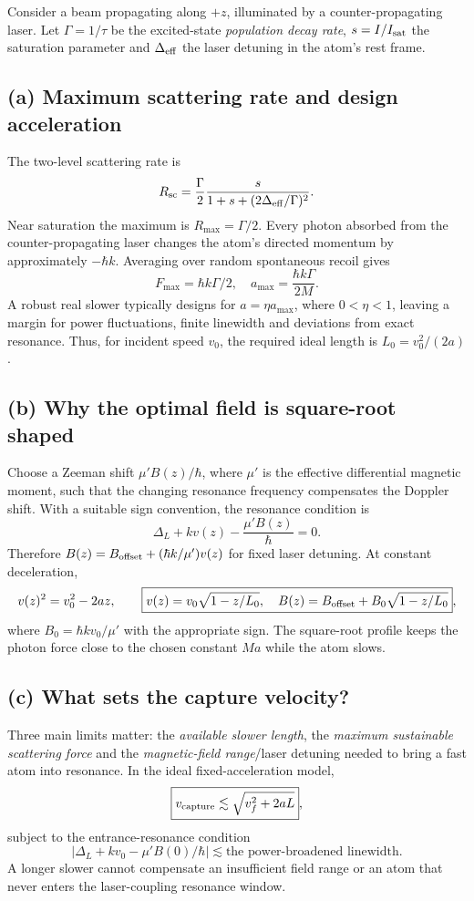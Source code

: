 Consider a beam propagating along \(+z\), illuminated by
a counter-propagating laser. Let \(\Gamma=1/\tau\)
be the excited-state \emph{population decay rate},
\(s=I/I_{\rm sat}\) the saturation parameter and
\(\Delta_{\rm eff}\) the laser detuning in the
atom's rest frame.

\subsection*{(a) Maximum scattering rate and design acceleration}
The two-level scattering rate is
\[
R_{\rm sc}=\frac{\Gamma}{2}
\frac{s}{1+s+(2\Delta_{\rm eff}/\Gamma)^2}.
\]
Near saturation the maximum is
\(R_{\max}=\Gamma/2\).
Every photon absorbed from the counter-propagating
laser changes the atom's directed momentum by
approximately \(-\hbar k\). Averaging over random
spontaneous recoil gives
\[
\boxed{F_{\max}=\hbar k\Gamma/2,\quad
a_{\max}=\frac{\hbar k\Gamma}{2M}}.
\]
A robust real slower typically designs for
\(a=\eta a_{\max}\), where \(0<\eta<1\),
leaving a margin for power fluctuations, finite
linewidth and deviations from exact resonance.
Thus, for incident speed \(v_0\), the required
ideal length is \(L_0=v_0^2/(2a)\).

\subsection*{(b) Why the optimal field is square-root shaped}
Choose a Zeeman shift
\(\mu' B(z)/\hbar\), where \(\mu'\) is the
effective differential magnetic moment,
such that the changing resonance frequency
compensates the Doppler shift. With a suitable
sign convention, the resonance condition is
\[
\Delta_L+k v(z)-\frac{\mu' B(z)}{\hbar}=0.
\]
Therefore \(B(z)=B_{\rm offset}
+(\hbar k/\mu')v(z)\) for fixed laser detuning.
At constant deceleration,
\[
v(z)^2=v_0^2-2az,\qquad
\boxed{v(z)=v_0\sqrt{1-z/L_0},\quad
B(z)=B_{\rm offset}+B_0\sqrt{1-z/L_0}},
\]
where \(B_0=\hbar k v_0/\mu'\) with the
appropriate sign. The square-root profile
keeps the photon force close to the
chosen constant \(Ma\) while the atom slows.

\subsection*{(c) What sets the capture velocity?}
Three main limits matter: the \emph{available
slower length}, the \emph{maximum sustainable
scattering force} and the \emph{magnetic-field
range}/laser detuning needed to bring a fast
atom into resonance. In the ideal fixed-acceleration
model,
\[
\boxed{v_{\rm capture}\lesssim
\sqrt{v_f^2+2aL}},
\]
subject to the entrance-resonance condition
\[
|\Delta_L+kv_0-\mu' B(0)/\hbar|
\lesssim\text{the power-broadened linewidth}.
\]
A longer slower cannot compensate an insufficient
field range or an atom that never enters the
laser-coupling resonance window.

